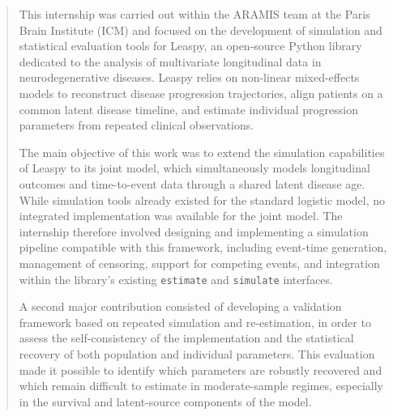 \documentclass{rapportCS}
\begin{document}
\begin{abstract}
This internship was carried out within the ARAMIS team at the Paris Brain Institute (ICM) and focused on the development of simulation and statistical evaluation tools for Leaspy, an open-source Python library dedicated to the analysis of multivariate longitudinal data in neurodegenerative diseases. Leaspy relies on non-linear mixed-effects models to reconstruct disease progression trajectories, align patients on a common latent disease timeline, and estimate individual progression parameters from repeated clinical observations.

The main objective of this work was to extend the simulation capabilities of Leaspy to its joint model, which simultaneously models longitudinal outcomes and time-to-event data through a shared latent disease age. While simulation tools already existed for the standard logistic model, no integrated implementation was available for the joint model. The internship therefore involved designing and implementing a simulation pipeline compatible with this framework, including event-time generation, management of censoring, support for competing events, and integration within the library's existing \texttt{estimate} and \texttt{simulate} interfaces.

A second major contribution consisted of developing a validation framework based on repeated simulation and re-estimation, in order to assess the self-consistency of the implementation and the statistical recovery of both population and individual parameters. This evaluation made it possible to identify which parameters are robustly recovered and which remain difficult to estimate in moderate-sample regimes, especially in the survival and latent-source components of the model.
\end{abstract}
\end{document}
